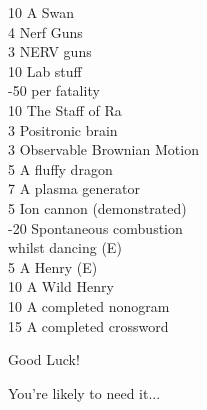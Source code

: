\begin{multicols}{2}
\begin{tabbing}
10	\> A Swan \\
4	\> Nerf Guns \\
3	\> NERV guns \\
10	\> Lab stuff \\
-50	\> per fatality \\
10	\> The Staff of Ra \\
3	\> Positronic brain \\
3	\> Observable Brownian Motion \\
5	\> A fluffy dragon \\
7	\> A plasma generator \\
5	\> Ion cannon (demonstrated) \\
-20	\> Spontaneous combustion \\ \> whilst dancing (E)\\
5	\> A Henry (E)\\
10	\> A Wild Henry\\
10	\> A completed nonogram\\
15	\> A completed crossword\\
	\end{tabbing}
\end{multicols}

{\large Good Luck!}

You're likely to need it...
